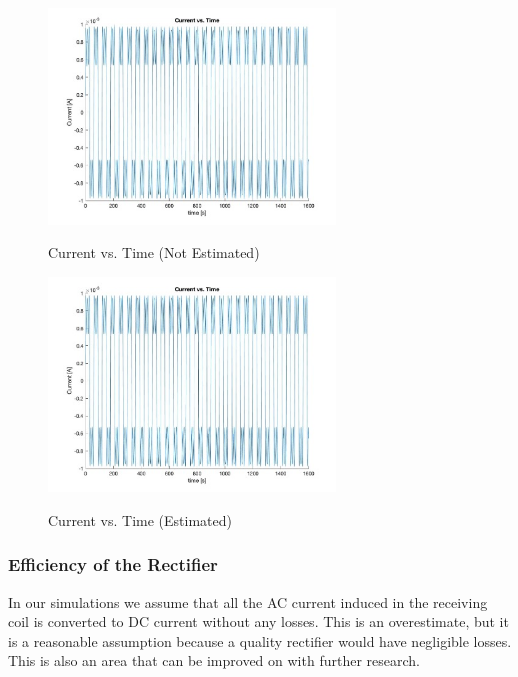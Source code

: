 \begin{figure}
    \begin{center}
    \includegraphics[width=3in]{fig11.jpg}
    \end{center}
    \renewcommand{\baselinestretch}{1}
    \small\normalsize
    \begin{quote}
    \caption[Current vs. Time (Not Estimated)]{Current vs. Time (Not Estimated)} \label{fig: f11}
    \end{quote}
\end{figure}

\begin{figure}
    \begin{center}
    \includegraphics[width=3in]{fig12.jpg}
    \end{center}
    \renewcommand{\baselinestretch}{1}
    \small\normalsize
    \begin{quote}
    \caption[Current vs. Time (Estimated)]{Current vs. Time (Estimated)} \label{fig: f12}
    \end{quote}
\end{figure}

\subsubsection{Efficiency of the Rectifier}
In our simulations we assume that all the AC current induced in the receiving coil is converted to DC 
current without any losses. This is an overestimate, but it is a reasonable assumption because a quality 
rectifier would have negligible losses. This is also an area that can be improved on with further research.

